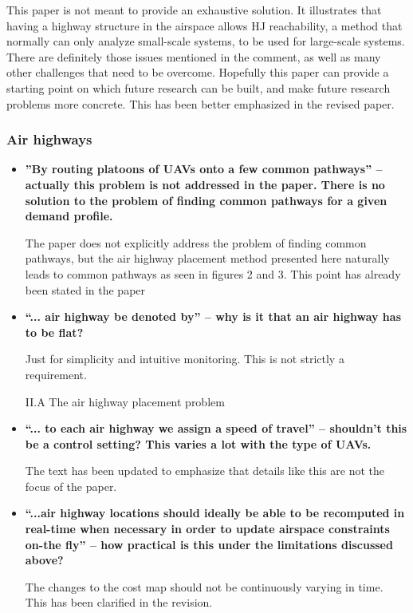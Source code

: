\documentclass[submit]{aiaa-pretty}
\begin{document}
\begin{itemize}
This paper is not meant to provide an exhaustive solution. It illustrates that having a highway structure in the airspace allows HJ reachability, a method that normally can only analyze small-scale systems, to be used for large-scale systems. There are definitely those issues mentioned in the comment, as well as many other challenges that need to be overcome. Hopefully this paper can provide a starting point on which future research can be built, and make future research problems more concrete. This has been better emphasized in the revised paper.
\end{itemize}

\subsubsection{Air highways}
\begin{itemize}
\item \textbf{''By routing platoons of UAVs onto a few common pathways'' – actually this problem is not addressed in the paper. There is no solution to the problem of finding common pathways for a given demand profile.}

The paper does not explicitly address the problem of finding common pathways, but the air highway placement method presented here naturally leads to common pathways as seen in figures 2 and 3. This point has already been stated in the paper

\item \textbf{``... air highway be denoted by'' – why is it that an air highway has to be flat?}

Just for simplicity and intuitive monitoring. This is not strictly a requirement.

II.A The air highway placement problem
\item \textbf{``... to each air highway we assign a speed of travel'' – shouldn’t this be a control setting? This varies a lot with the type of UAVs.}

The text has been updated to emphasize that details like this are not the focus of the paper.

\item \textbf{``...air highway locations should ideally be able to be recomputed in real-time when necessary in order to update airspace constraints on-the fly'' – how practical is this under the limitations discussed above?}

The changes to the cost map should not be continuously varying in time. This has been clarified in the revision.


\end{itemize}
\end{document}

